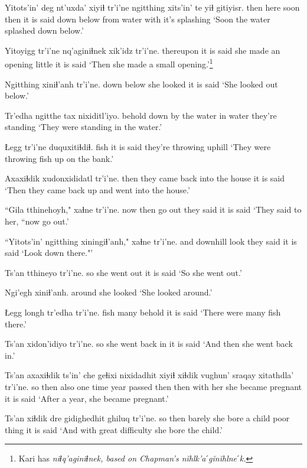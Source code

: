 \documentclass[12pt]{article}
\begin{document}
\gll Yitots'in' deg nt'uxda' xiyiɬ tr'i'ne ngitthing xits'in' te yiɬ gitiyisr.
then  here soon  then {it is said} {down below} from  water with {it's splashing}
\glt `Soon the water splashed down below.'
\glend

\gll Yitoyigg tr'i'ne nq'aginiɬnek xik'idz tr'i'ne.
thereupon {it is said} {she made an opening} little {it is said}
\glt `Then she made a small opening.'\footnote{Kari has \em niɬq'aginiɬnek, \em based on Chapman's \em n\u{i}hlk'aˊg\u{i}n\u{i}hlneˊk.}
\glend

\gll Ngitthing xiniɬ'anh tr'i'ne.
{down below} {she looked} {it is said}
\glt `She looked out below.'
\glend

\gll Tr'edha ngitthe  tax  nixiditl'iyo.
behold  {down by the water} {in water} {they're standing}
\glt `They were standing in the water.'
\glend

\gll Łegg tr'i'ne duquxitiɬdiɬ.
fish {it is said} {they're throwing uphill}
\glt `They were throwing fish up on the bank.'
\glend

\gll Axaxiɬdik xudonxididatl  tr'i'ne.
then  {they came back into the house} {it is said}
\glt `Then they came back up and went into the house.'
\glend

\gll ``Gila  tthinehoyh," xaɬne  tr'i'ne.
{now then} {go out} {they said} {it is said}
\glt `They said to her, ``now go out.'
\glend

\gll ``Yitots'in' ngitthing  xiningiɬ'anh," xaɬne  tr'i'ne.
and  downhill look  {they said} {it is said}
\glt `Look down there."'
\glend

\gll Ts'an tthineyo tr'i'ne.
so {she went out} {it is said}
\glt `So she went out.'
\glend

\gll Ngi'egh xiniɬ'anh.
around  {she looked}
\glt `She looked around.'
\glend

\gll Łegg longh tr'edha tr'i'ne.
fish many behold  {it is said}
\glt `There were many fish there.'
\glend

\gll Ts'an xidon'idiyo  tr'i'ne.
so {she went back in} {it is said}
\glt `And then she went back in.'
\glend

\gll Ts'an axaxiɬdik ts'in' che geɬixi nixidadhit xiyiɬ xiɬdik  vughun' {sraqay xitathdla'} tr'i'ne.
so then {} also {one time} {year passed} then then  {with her} {she became pregnant} {it is said}
\glt `After a year, she became pregnant.'
\glend

\gll Ts'an  xiɬdik  dre gidighedhit  ghiluq tr'i'ne.
so  then  barely {she bore a child} {poor thing} {it is said}
\glt `And with great difficulty she bore the child.'
\glend
\end{document}
